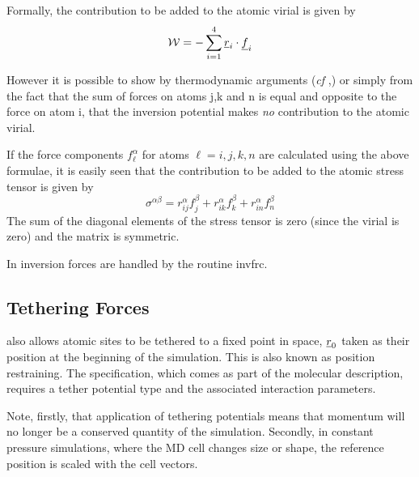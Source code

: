 Formally, the contribution to be added to the
atomic virial is given by
\begin{equation}
{\cal W}=-\sum_{i=1}^{4}\mbox{$\underline{r}$}_{i}\cdot\mbox{$\underline{f}$}_{i}
\end{equation}

However it is possible to show by thermodynamic arguments ({\em cf}
\cite{smith-93c},) or simply from the fact that the sum of forces on
atoms j,k and n is equal and opposite to the force on atom i, that the
inversion potential makes {\em no} contribution to the atomic virial.

If the force components $f_{\ell}^{\alpha}$ for atoms $\ell=i,j,k,n$ are
calculated using the above formulae, it is easily seen that
the contribution to be added to the atomic stress tensor is given by
\begin{equation}
\sigma^{\alpha \beta}=r_{ij}^{\alpha}f_{j}^{\beta}+
r_{ik}^{\alpha}f_{k}^{\beta}+r_{in}^{\alpha}f_{n}^{\beta}
\end{equation}
The sum of the diagonal elements of the stress tensor is zero (since
the virial is zero) and the matrix is symmetric.

In \D{} inversion forces are handled by the routine {\sc invfrc}.

\subsection{Tethering Forces}

\D{} also allows atomic sites to be tethered to a fixed point in space, $\mbox{$\underline{r}$}_0$ taken as their
position at the beginning of the simulation. This is also known as position restraining.
The specification, which comes as part of the molecular description,
requires a tether potential type and the associated interaction parameters.

Note, firstly, that application of tethering potentials means that momentum will
no longer be a conserved quantity of the simulation. Secondly, in constant
pressure simulations, where the MD cell changes size or shape, the reference position
is scaled with the cell vectors.

